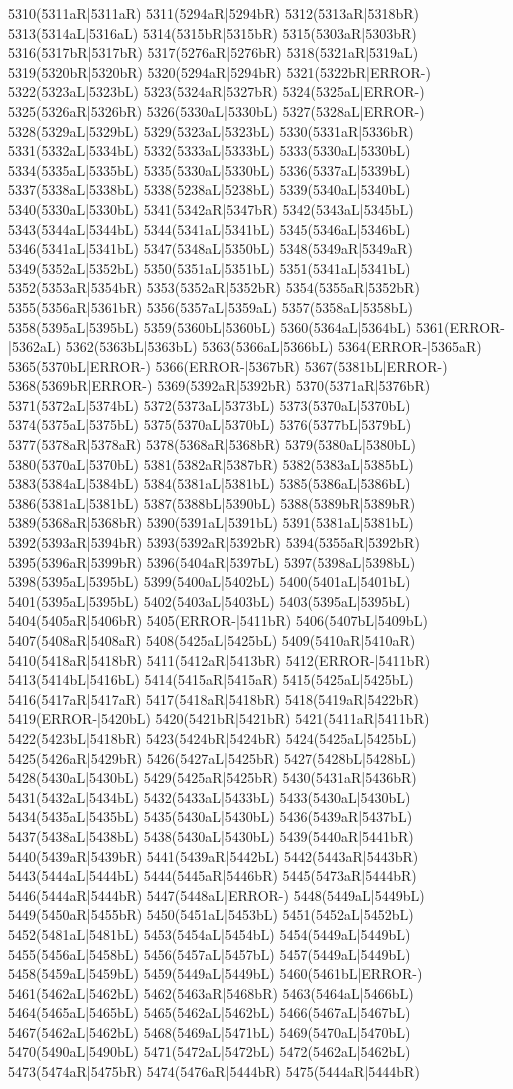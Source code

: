 5310(5311aR|5311aR) 5311(5294aR|5294bR) 5312(5313aR|5318bR) 5313(5314aL|5316aL) 5314(5315bR|5315bR) 5315(5303aR|5303bR) 5316(5317bR|5317bR) 5317(5276aR|5276bR) 5318(5321aR|5319aL) 5319(5320bR|5320bR) 5320(5294aR|5294bR) 5321(5322bR|ERROR-) 5322(5323aL|5323bL) 5323(5324aR|5327bR) 5324(5325aL|ERROR-) 5325(5326aR|5326bR) 5326(5330aL|5330bL) 5327(5328aL|ERROR-) 5328(5329aL|5329bL) 5329(5323aL|5323bL) 5330(5331aR|5336bR) 5331(5332aL|5334bL) 5332(5333aL|5333bL) 5333(5330aL|5330bL) 5334(5335aL|5335bL) 5335(5330aL|5330bL) 5336(5337aL|5339bL) 5337(5338aL|5338bL) 5338(5238aL|5238bL) 5339(5340aL|5340bL) 5340(5330aL|5330bL) 5341(5342aR|5347bR) 5342(5343aL|5345bL) 5343(5344aL|5344bL) 5344(5341aL|5341bL) 5345(5346aL|5346bL) 5346(5341aL|5341bL) 5347(5348aL|5350bL) 5348(5349aR|5349aR) 5349(5352aL|5352bL) 5350(5351aL|5351bL) 5351(5341aL|5341bL) 5352(5353aR|5354bR) 5353(5352aR|5352bR) 5354(5355aR|5352bR) 5355(5356aR|5361bR) 5356(5357aL|5359aL) 5357(5358aL|5358bL) 5358(5395aL|5395bL) 5359(5360bL|5360bL) 5360(5364aL|5364bL) 5361(ERROR-|5362aL) 5362(5363bL|5363bL) 5363(5366aL|5366bL) 5364(ERROR-|5365aR) 5365(5370bL|ERROR-) 5366(ERROR-|5367bR) 5367(5381bL|ERROR-) 5368(5369bR|ERROR-) 5369(5392aR|5392bR) 5370(5371aR|5376bR) 5371(5372aL|5374bL) 5372(5373aL|5373bL) 5373(5370aL|5370bL) 5374(5375aL|5375bL) 5375(5370aL|5370bL) 5376(5377bL|5379bL) 5377(5378aR|5378aR) 5378(5368aR|5368bR) 5379(5380aL|5380bL) 5380(5370aL|5370bL) 5381(5382aR|5387bR) 5382(5383aL|5385bL) 5383(5384aL|5384bL) 5384(5381aL|5381bL) 5385(5386aL|5386bL) 5386(5381aL|5381bL) 5387(5388bL|5390bL) 5388(5389bR|5389bR) 5389(5368aR|5368bR) 5390(5391aL|5391bL) 5391(5381aL|5381bL) 5392(5393aR|5394bR) 5393(5392aR|5392bR) 5394(5355aR|5392bR) 5395(5396aR|5399bR) 5396(5404aR|5397bL) 5397(5398aL|5398bL) 5398(5395aL|5395bL) 5399(5400aL|5402bL) 5400(5401aL|5401bL) 5401(5395aL|5395bL) 5402(5403aL|5403bL) 5403(5395aL|5395bL) 5404(5405aR|5406bR) 5405(ERROR-|5411bR) 5406(5407bL|5409bL) 5407(5408aR|5408aR) 5408(5425aL|5425bL) 5409(5410aR|5410aR) 5410(5418aR|5418bR) 5411(5412aR|5413bR) 5412(ERROR-|5411bR) 5413(5414bL|5416bL) 5414(5415aR|5415aR) 5415(5425aL|5425bL) 5416(5417aR|5417aR) 5417(5418aR|5418bR) 5418(5419aR|5422bR) 5419(ERROR-|5420bL) 5420(5421bR|5421bR) 5421(5411aR|5411bR) 5422(5423bL|5418bR) 5423(5424bR|5424bR) 5424(5425aL|5425bL) 5425(5426aR|5429bR) 5426(5427aL|5425bR) 5427(5428bL|5428bL) 5428(5430aL|5430bL) 5429(5425aR|5425bR) 5430(5431aR|5436bR) 5431(5432aL|5434bL) 5432(5433aL|5433bL) 5433(5430aL|5430bL) 5434(5435aL|5435bL) 5435(5430aL|5430bL) 5436(5439aR|5437bL) 5437(5438aL|5438bL) 5438(5430aL|5430bL) 5439(5440aR|5441bR) 5440(5439aR|5439bR) 5441(5439aR|5442bL) 5442(5443aR|5443bR) 5443(5444aL|5444bL) 5444(5445aR|5446bR) 5445(5473aR|5444bR) 5446(5444aR|5444bR) 5447(5448aL|ERROR-) 5448(5449aL|5449bL) 5449(5450aR|5455bR) 5450(5451aL|5453bL) 5451(5452aL|5452bL) 5452(5481aL|5481bL) 5453(5454aL|5454bL) 5454(5449aL|5449bL) 5455(5456aL|5458bL) 5456(5457aL|5457bL) 5457(5449aL|5449bL) 5458(5459aL|5459bL) 5459(5449aL|5449bL) 5460(5461bL|ERROR-) 5461(5462aL|5462bL) 5462(5463aR|5468bR) 5463(5464aL|5466bL) 5464(5465aL|5465bL) 5465(5462aL|5462bL) 5466(5467aL|5467bL) 5467(5462aL|5462bL) 5468(5469aL|5471bL) 5469(5470aL|5470bL) 5470(5490aL|5490bL) 5471(5472aL|5472bL) 5472(5462aL|5462bL) 5473(5474aR|5475bR) 5474(5476aR|5444bR) 5475(5444aR|5444bR) 